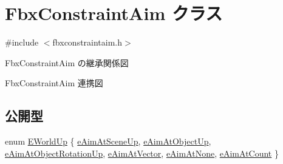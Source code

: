 \hypertarget{class_fbx_constraint_aim}{}\section{Fbx\+Constraint\+Aim クラス}
\label{class_fbx_constraint_aim}


{\ttfamily \#include $<$fbxconstraintaim.\+h$>$}



Fbx\+Constraint\+Aim の継承関係図


Fbx\+Constraint\+Aim 連携図
\subsection*{公開型}
\begin{DoxyCompactItemize}
\item 
enum \hyperlink{class_fbx_constraint_aim_a90316b1564490f5dd0b24e552fe6e637}{E\+World\+Up} \{ \newline
\hyperlink{class_fbx_constraint_aim_a90316b1564490f5dd0b24e552fe6e637ab95495d4f984536c4e6308ed74558281}{e\+Aim\+At\+Scene\+Up}, 
\hyperlink{class_fbx_constraint_aim_a90316b1564490f5dd0b24e552fe6e637a9a5491d58c5255bc7c1a62e6ef7a95c2}{e\+Aim\+At\+Object\+Up}, 
\hyperlink{class_fbx_constraint_aim_a90316b1564490f5dd0b24e552fe6e637abf40447e1656622e38b3e5999aaee85a}{e\+Aim\+At\+Object\+Rotation\+Up}, 
\hyperlink{class_fbx_constraint_aim_a90316b1564490f5dd0b24e552fe6e637a72b5340ebf521ea46e39f3e53b9dbbb9}{e\+Aim\+At\+Vector}, 
\newline
\hyperlink{class_fbx_constraint_aim_a90316b1564490f5dd0b24e552fe6e637a9c547307df4408653e50bc3338a9fcf8}{e\+Aim\+At\+None}, 
\hyperlink{class_fbx_constraint_aim_a90316b1564490f5dd0b24e552fe6e637ad2513eb36142b46f590c27043d713c31}{e\+Aim\+At\+Count}
 \}
\end{DoxyCompactItemize}
